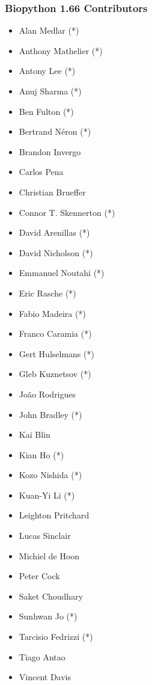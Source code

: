 \documentclass[trans]{beamer}
\begin{document}
{
  \frametitle{Biopython 1.66 Contributors}

  \scriptsize{
  \begin{multicols}{2}
  \begin{itemize}
  \item Alan Medlar (*)
  \item Anthony Mathelier (*)
  \item Antony Lee (*)
  \item Anuj Sharma (*)
  \item Ben Fulton (*)
  \item Bertrand Néron (*)
  \item Brandon Invergo
  \item Carlos Pena
  \item Christian Brueffer
  \item Connor T. Skennerton (*)
  \item David Arenillas (*)
  \item David Nicholson (*)
  \item Emmanuel Noutahi (*)
  \item Eric Rasche (*)
  \item Fabio Madeira (*)
  \item Franco Caramia (*)
  \item Gert Hulselmans (*)
  \item Gleb Kuznetsov (*)
  \item João Rodrigues
  \item John Bradley (*)
  \item Kai Blin
  \item Kian Ho (*)
  \item Kozo Nishida (*)
  \item Kuan-Yi Li (*)
  \item Leighton Pritchard
  \item Lucas Sinclair
  \item Michiel de Hoon
  \item Peter Cock
  \item Saket Choudhary
  \item Sunhwan Jo (*)
  \item Tarcisio Fedrizzi (*)
  \item Tiago Antao
  \item Vincent Davis
  \end{itemize}
  \end{multicols}
  }
}
\end{document}
